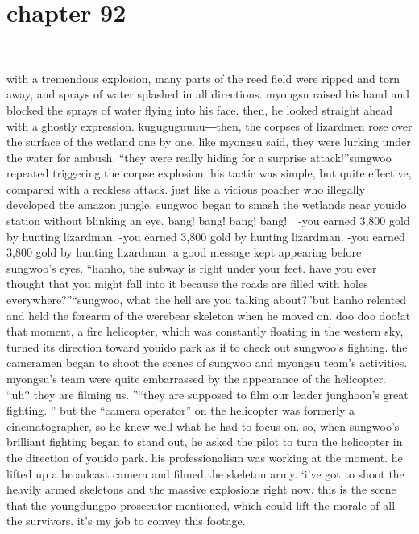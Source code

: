 \section{chapter 92}

                             




with a tremendous explosion, many parts of the reed field were ripped and torn away, and sprays of water splashed in all directions.
myongsu raised his hand and blocked the sprays of water flying into his face.
 then, he looked straight ahead with a ghostly expression.
kuguguguuuu―then, the corpses of lizardmen rose over the surface of the wetland one by one.
like myongsu said, they were lurking under the water for ambush.
“they were really hiding for a surprise attack!”sungwoo repeated triggering the corpse explosion.
 his tactic was simple, but quite effective, compared with a reckless attack.
just like a vicious poacher who illegally developed the amazon jungle, sungwoo began to smash the wetlands near youido station without blinking an eye.
bang! bang! bang! bang!  -you earned 3,800 gold by hunting lizardman.
-you earned 3,800 gold by hunting lizardman.
-you earned 3,800 gold by hunting lizardman.
a good message kept appearing before sungwoo’s eyes.
“hanho, the subway is right under your feet.
 have you ever thought that you might fall into it because the roads are filled with holes everywhere?”“sungwoo, what the hell are you talking about?”but hanho relented and held the forearm of the werebear skeleton when he moved on.
doo doo doo!at that moment, a fire helicopter, which was constantly floating in the western sky, turned its direction toward youido park as if to check out sungwoo’s fighting.
 the cameramen began to shoot the scenes of sungwoo and myongsu team’s activities.
myongsu’s team were quite embarrassed by the appearance of the helicopter.
“uh? they are filming us.
”“they are supposed to film our leader junghoon’s great fighting.
”
but the “camera operator” on the helicopter was formerly a cinematographer, so he knew well what he had to focus on.
so, when sungwoo’s brilliant fighting began to stand out, he asked the pilot to turn the helicopter in the direction of youido park.
 his professionalism was working at the moment.
he lifted up a broadcast camera and filmed the skeleton army.
‘i’ve got to shoot the heavily armed skeletons and the massive explosions right now.
 this is the scene that the youngdungpo prosecutor mentioned, which could lift the morale of all the survivors.
 it’s my job to convey this footage.

